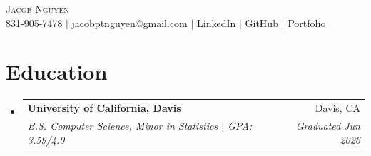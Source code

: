 \documentclass[letterpaper,10.5pt]{article}
\makeatletter
\newcommand{\resumeSubheading}[4]{
  \vspace{-2pt}\item
    \begin{tabular*}{0.97\textwidth}[t]{l@{\extracolsep{\fill}}r}
      \textbf{\normalsize #1} & \normalsize #2 \\[-1pt]
      \textit{\small#3} & \textit{\small #4} \\
    \end{tabular*}\vspace{-7pt}
}
\newcommand{\resumeSubHeadingListStart}{\begin{itemize}[leftmargin=0.15in, label={}]}
\newcommand{\resumeSubHeadingListEnd}{\end{itemize}}
\makeatother
\begin{document}
\begin{center}
    {\Huge \scshape Jacob Nguyen} \\ \vspace{1pt}
    \small 831-905-7478 $|$
    \href{mailto:jacobptnguyen@gmail.com}{jacobptnguyen@gmail.com} $|$
    \href{https://www.linkedin.com/in/jacob-nguyen-138267262}{LinkedIn} $|$
    \href{https://github.com/jacobptnguyen}{GitHub} $|$
    \href{https://jacob-nguyen-portfolio.vercel.app/}{Portfolio}
\end{center}
\section{Education}
  \resumeSubHeadingListStart
    \resumeSubheading
      {University of California, Davis}{Davis, CA}
      {B.S. Computer Science, Minor in Statistics $|$ GPA: 3.59/4.0}{Graduated Jun 2026}
  \resumeSubHeadingListEnd
\end{document}
